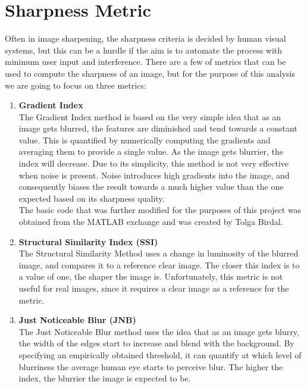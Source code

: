\graphicspath{{mehul_pics/}}%

\section{Sharpness Metric}
Often in image sharpening, the sharpness criteria is decided by human visual systems, but this can be a hurdle if the aim is to automate the process with minimum user input and interference. There are a few of metrics that can be used to compute the sharpness of an image, but for the purpose of this analysis we are going to focus on three metrics:

\begin{enumerate}
\item {\bf Gradient Index} \\
The Gradient Index method is based on the very simple idea that as an image gets blurred, the features are diminished and tend towards a constant value. This is quantified by numerically computing the gradients and averaging them to provide a single value. As the image gets blurrier, the index will decrease.
Due to its simplicity, this method is not very effective when noise is present. Noise introduces high gradients into the image, and consequently biases the result towards a much higher value than the one expected based on its sharpness quality.  \\
The basic code that was further modified for the purposes of this project was obtained from the MATLAB exchange and was created by Tolga Birdal.

\item {\bf Structural Similarity Index (SSI)~\cite{Wang:2004}} \\
The Structural Similarity Method uses a change in luminosity of the blurred image, and compares it to a reference clear image. The closer this index is to a value of one, the shaper the image is. Unfortunately, this metric is not useful for real images, since it requires a clear image as a reference for the metric.

\item {\bf Just Noticeable Blur (JNB)~\cite{Ferzli:2009}} \\
The Just Noticeable Blur method uses the idea that as an image gets blurry, the width of the edges start to increase and blend with the background. By specifying an empirically obtained threshold, it can quantify at which level of blurriness the average human eye starts to perceive blur. The higher the index, the blurrier the image is expected to be.
\end{enumerate}
\vspace{-15pt}
